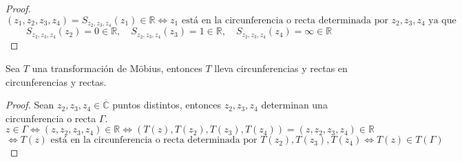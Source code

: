 \begin{proof}
    \[
        (z_1, z_2, z_3, z_4) = S_{z_2, z_3, z_4}(z_1) \in \mathbb{R} \iff z_1 \text{ está en la circunferencia o recta determinada por } z_2, z_3, z_4 \text{ ya que}
    \]
    \[
        S_{z_2, z_3, z_4}(z_2) = 0 \in \mathbb{R}, \quad S_{z_2, z_3, z_4}(z_3) = 1 \in \mathbb{R}, \quad S_{z_2, z_3, z_4}(z_4) = \infty \in \mathbb{R} 
    \]
\end{proof}

\begin{teorema}
    Sea $T$ una transformación de Möbius, entonces $T$ lleva circunferencias y rectas en circunferencias y rectas.
\end{teorema}

\begin{proof}
    Sean $z_2, z_3, z_4 \in \overline{\mathbb{C}}$ puntos distintos, entonces $z_2, z_3, z_4$ determinan una circunferencia o recta $\Gamma$.
    \[
        z \in \Gamma \iff (z, z_2, z_3, z_4) \in \mathbb{R} \iff (T(z), T(z_2), T(z_3), T(z_4)) = (z, z_2, z_3, z_4) \in \mathbb{R} 
    \]
    \[
        \iff T(z) \text{ está en la circunferencia o recta determinada por } T(z_2), T(z_3), T(z_4) \iff T(z) \in T(\Gamma)
    \]
\end{proof}


